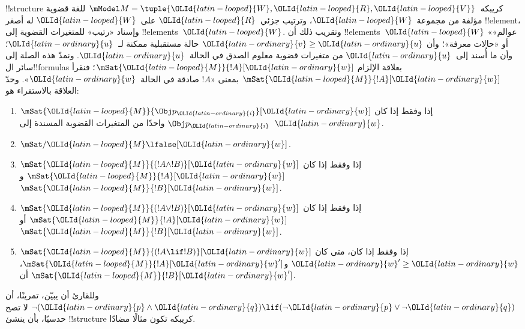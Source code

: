 \documentclass[../../../include/open-logic-section]{subfiles}
\begin{document}
!!{structure} كريبكه~$\mModel M = \tuple{\OLId{latin-looped}{W}, \OLId{latin-looped}{R}, \OLId{latin-looped}{V}}$ للغة قضوية
مؤلفة من مجموعة~$\OLId{latin-looped}{W}$، وترتيب جزئي~$\OLId{latin-looped}{R}$ على~$\OLId{latin-looped}{W}$ له أصغر
!!{element}، وإسناد «رتيب» للمتغيرات القضوية إلى !!{element}s~$\OLId{latin-looped}{W}$.
وتقريب ذلك أن !!{element}s~$\OLId{latin-looped}{W}$ «عوالم» أو «حالات معرفة»؛
وأن $\OLId{latin-ordinary}{v} \geq \OLId{latin-ordinary}{u}$ حالة مستقبلية ممكنة لـ~$\OLId{latin-ordinary}{u}$؛ وأن ما أُسند
إلى~$\OLId{latin-ordinary}{u}$ من متغيرات قضوية معلوم الصدق في الحالة~$\OLId{latin-ordinary}{u}$.
ونمدّ هذه الصلة إلى سائر ال!!{formula}s بعلاقة الإلزام
$\mSat{\OLId{latin-looped}{M}}{!A}[\OLId{latin-ordinary}{w}]$؛ فنقرأ $\mSat{\OLId{latin-looped}{M}}{!A}[\OLId{latin-ordinary}{w}]$ بمعنى
«$!A$ صادقة في الحالة~$\OLId{latin-ordinary}{w}$». وحدّ العلاقة بالاستقراء هو:
\begin{enumerate}
\item $\mSat{\OLId{latin-looped}{M}}{\Obj p_\OLId{latin-ordinary}{i}}[\OLId{latin-ordinary}{w}]$ إذا وفقط إذا كان $\Obj p_\OLId{latin-ordinary}{i}$ واحدًا من
  المتغيرات القضوية المسندة إلى~$\OLId{latin-ordinary}{w}$.
\item $\mSat/{\OLId{latin-looped}{M}}{\lfalse}[\OLId{latin-ordinary}{w}]$.
\item $\mSat{\OLId{latin-looped}{M}}{(!A \land !B)}[\OLId{latin-ordinary}{w}]$ إذا وفقط إذا كان
  $\mSat{\OLId{latin-looped}{M}}{!A}[\OLId{latin-ordinary}{w}]$ و$\mSat{\OLId{latin-looped}{M}}{!B}[\OLId{latin-ordinary}{w}]$.
\item $\mSat{\OLId{latin-looped}{M}}{(!A \lor !B)}[\OLId{latin-ordinary}{w}]$ إذا وفقط إذا كان
  $\mSat{\OLId{latin-looped}{M}}{!A}[\OLId{latin-ordinary}{w}]$ أو $\mSat{\OLId{latin-looped}{M}}{!B}[\OLId{latin-ordinary}{w}]$.
\item $\mSat{\OLId{latin-looped}{M}}{(!A \lif !B)}[\OLId{latin-ordinary}{w}]$ إذا وفقط إذا كان، متى كان
  $\OLId{latin-ordinary}{w}' \geq \OLId{latin-ordinary}{w}$ و$\mSat{\OLId{latin-looped}{M}}{!A}[\OLId{latin-ordinary}{w}']$، أن $\mSat{\OLId{latin-looped}{M}}{!B}[\OLId{latin-ordinary}{w}']$.
\end{enumerate}
وللقارئ أن يبيّن، تمرينًا، أن $\lnot (\OLId{latin-ordinary}{p} \land \OLId{latin-ordinary}{q}) \lif
(\lnot \OLId{latin-ordinary}{p} \lor \lnot \OLId{latin-ordinary}{q})$ لا تصح حدسيًا، بأن ينشئ !!{structure}
كريبكه تكون مثالًا مضادًا.
\end{document}
